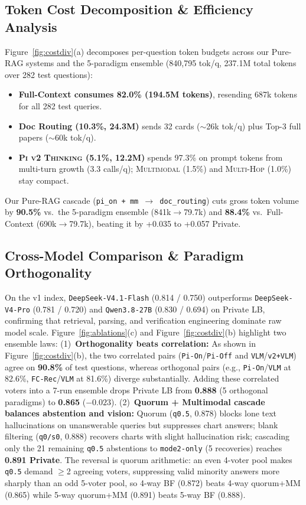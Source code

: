 \documentclass[sigconf,nonacm]{acmart}
\newcommand{\code}[1]{\texttt{\small #1}}
\begin{document}
\subsection{Token Cost Decomposition \& Efficiency Analysis}
Figure~\ref{fig:costdiv}(a) decomposes per-question token budgets across our Pure-RAG systems and the 5-paradigm ensemble (840,795 tok/q, 237.1M total tokens over 282 test questions):
\begin{itemize}
  \item \textbf{Full-Context consumes 82.0\% (194.5M tokens)}, resending 687k tokens for all 282 test queries.
  \item \textbf{Doc Routing (10.3\%, 24.3M)} sends 32 cards ($\sim$26k tok/q) plus Top-3 full papers ($\sim$60k tok/q).
  \item \textbf{\textsc{Pi v2 Thinking} (5.1\%, 12.2M)} spends 97.3\% on prompt tokens from multi-turn growth (3.3 calls/q); \textsc{Multimodal} (1.5\%) and \textsc{Multi-Hop} (1.0\%) stay compact.
\end{itemize}
Our Pure-RAG cascade (\code{pi\_on + mm $\to$ doc\_routing}) cuts gross token volume by \textbf{90.5\%} vs.\ the 5-paradigm ensemble (841k$\to$79.7k) and \textbf{88.4\%} vs.\ Full-Context (690k$\to$79.7k), beating it by +0.035 to +0.057 Private.

\subsection{Cross-Model Comparison \& Paradigm Orthogonality}
On the v1 index, \code{DeepSeek-V4.1-Flash} (0.814 / 0.750) outperforms \code{DeepSeek-V4-Pro} (0.781 / 0.720) and \code{Qwen3.8-27B} (0.830 / 0.694) on Private LB, confirming that retrieval, parsing, and verification engineering dominate raw model scale.
Figure~\ref{fig:ablations}(c) and Figure~\ref{fig:costdiv}(b) highlight two ensemble laws:
(1)~\textbf{Orthogonality beats correlation:} As shown in Figure~\ref{fig:costdiv}(b), the two correlated pairs (\code{Pi-On}/\code{Pi-Off} and \code{VLM}/\code{v2+VLM}) agree on \textbf{90.8\%} of test questions, whereas orthogonal pairs (e.g., \code{Pi-On}/\code{VLM} at 82.6\%, \code{FC-Rec}/\code{VLM} at 81.6\%) diverge substantially. Adding these correlated voters into a 7-run ensemble drops Private LB from \textbf{0.888} (5 orthogonal paradigms) to \textbf{0.865} ($-0.023$).
(2)~\textbf{Quorum + Multimodal cascade balances abstention and vision:} Quorum (\code{q0.5}, 0.878) blocks lone text hallucinations on unanswerable queries but suppresses chart answers; blank filtering (\code{q0/s0}, 0.888) recovers charts with slight hallucination risk; cascading only the 21 remaining \code{q0.5} abstentions to \code{mode2-only} (5 recoveries) reaches \textbf{0.891 Private}. The reversal is quorum arithmetic: an even 4-voter pool makes \code{q0.5} demand $\ge$2 agreeing voters, suppressing valid minority answers more sharply than an odd 5-voter pool, so 4-way BF (0.872) beats 4-way quorum+MM (0.865) while 5-way quorum+MM (0.891) beats 5-way BF (0.888).
\end{document}
